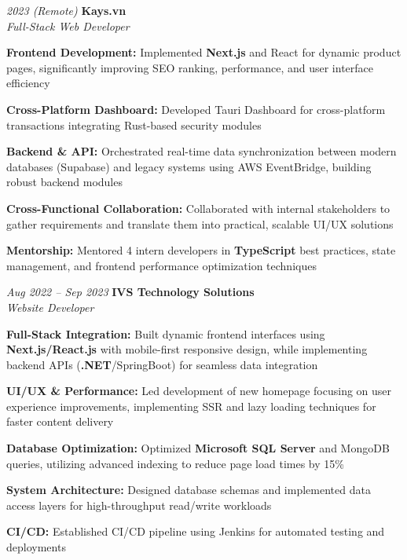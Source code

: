 \begin{twocolentry}{\textit{2023 (Remote)}}
    \textbf{Kays.vn} \\[4pt]
    \textit{Full-Stack Web Developer}
\end{twocolentry}
\begin{onecolentry}
    \begin{highlights}
        \item \textbf{Frontend Development:} Implemented \textbf{Next.js} and React for dynamic product pages, significantly improving SEO ranking, performance, and user interface efficiency
        \item \textbf{Cross-Platform Dashboard:} Developed Tauri Dashboard for cross-platform transactions integrating Rust-based security modules
        \item \textbf{Backend \& API:} Orchestrated real-time data synchronization between modern databases (Supabase) and legacy systems using AWS EventBridge, building robust backend modules
        \item \textbf{Cross-Functional Collaboration:} Collaborated with internal stakeholders to gather requirements and translate them into practical, scalable UI/UX solutions
        \item \textbf{Mentorship:} Mentored 4 intern developers in \textbf{TypeScript} best practices, state management, and frontend performance optimization techniques
    \end{highlights}
\end{onecolentry}
\vspace{0.2 cm}

\begin{twocolentry}{\textit{Aug 2022 -- Sep 2023}}
    \textbf{IVS Technology Solutions} \\[4pt]
    \textit{Website Developer}
\end{twocolentry}
\begin{onecolentry}
    \begin{highlights}
        \item \textbf{Full-Stack Integration:} Built dynamic frontend interfaces using \textbf{Next.js/React.js} with mobile-first responsive design, while implementing backend APIs (\textbf{.NET}/SpringBoot) for seamless data integration
        \item \textbf{UI/UX \& Performance:} Led development of new homepage focusing on user experience improvements, implementing SSR and lazy loading techniques for faster content delivery
        \item \textbf{Database Optimization:} Optimized \textbf{Microsoft SQL Server} and MongoDB queries, utilizing advanced indexing to reduce page load times by 15\%
        \item \textbf{System Architecture:} Designed database schemas and implemented data access layers for high-throughput read/write workloads
        \item \textbf{CI/CD:} Established CI/CD pipeline using Jenkins for automated testing and deployments
    \end{highlights}
\end{onecolentry}

